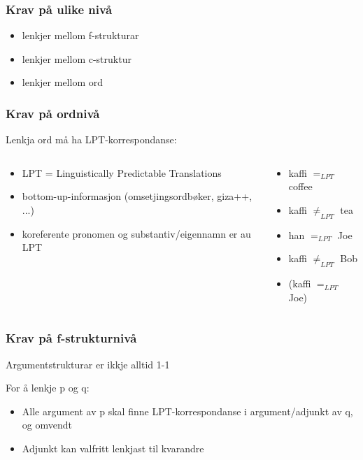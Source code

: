 \documentclass[bigger]{beamer}
\begin{document}
\begin{frame}\frametitle{Krav på ulike nivå}
  \begin{itemize}
  \item lenkjer mellom f-strukturar
  \item lenkjer mellom c-struktur
  \item lenkjer mellom ord %
  \end{itemize}
\end{frame}

\begin{frame}\frametitle{Krav på ordnivå}
  Lenkja ord må ha LPT-korrespondanse:
  \begin{columns}
    \begin{column}{0.5\textwidth}
      \begin{itemize}
      \item LPT = Linguistically Predictable Translations
      \item bottom-up-informasjon (omsetjingsordbøker, giza++, ...)
      \item koreferente pronomen og substantiv/eigennamn er au LPT
      \end{itemize}
    \end{column}

    \begin{column}{0.5\textwidth}
      \begin{itemize}
      \item kaffi $=_{LPT}$ coffee
      \item kaffi $\neq_{LPT}$ tea
      \item han $=_{LPT}$ Joe
      \item kaffi $\neq_{LPT}$ Bob
      \item (kaffi $=_{LPT}$ Joe)
      \end{itemize}
    \end{column}
  \end{columns}
\end{frame}


\begin{frame}\frametitle{Krav på f-strukturnivå}
  Argumentstrukturar er ikkje alltid 1-1
  
  For å lenkje p og q:
  \begin{itemize}
  \item Alle argument av p skal finne LPT-korrespondanse i argument/adjunkt av q, og omvendt
  \item Adjunkt kan valfritt lenkjast til kvarandre
  \end{itemize}
\end{frame}
\end{document}
